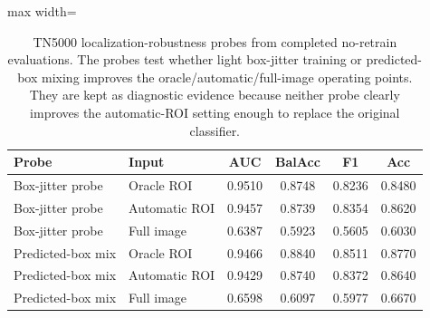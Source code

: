 \begin{table}[t]
    \centering
    \small
    \caption{TN5000 localization-robustness probes from completed no-retrain evaluations. The probes test whether light box-jitter training or predicted-box mixing improves the oracle/automatic/full-image operating points. They are kept as diagnostic evidence because neither probe clearly improves the automatic-ROI setting enough to replace the original classifier.}
    \label{tab:tn5000_localization_robustness_probe}
    \begin{adjustbox}{max width=\columnwidth}
    \begin{tabular}{llcccc}
        \toprule
        Probe & Input & AUC & BalAcc & F1 & Acc \\
        \midrule
        Box-jitter probe & Oracle ROI & 0.9510 & 0.8748 & 0.8236 & 0.8480 \\
        Box-jitter probe & Automatic ROI & 0.9457 & 0.8739 & 0.8354 & 0.8620 \\
        Box-jitter probe & Full image & 0.6387 & 0.5923 & 0.5605 & 0.6030 \\
        \midrule
        Predicted-box mix & Oracle ROI & 0.9466 & 0.8840 & 0.8511 & 0.8770 \\
        Predicted-box mix & Automatic ROI & 0.9429 & 0.8740 & 0.8372 & 0.8640 \\
        Predicted-box mix & Full image & 0.6598 & 0.6097 & 0.5977 & 0.6670 \\
        \bottomrule
    \end{tabular}
    \end{adjustbox}
\end{table}
